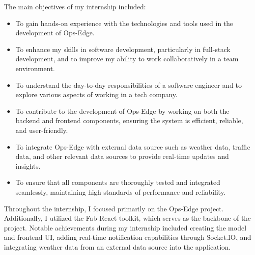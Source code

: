 The main objectives of my internship included:

\begin{itemize}
    \item To gain hands-on experience with the technologies and tools used in the development of Ops-Edge.
    \item To enhance my skills in software development, particularly in full-stack development, and to improve my ability to work collaboratively in a team environment.
    \item To understand the day-to-day responsibilities of a software engineer and to explore various aspects of working in a tech company.
    \item To contribute to the development of Ops-Edge by working on both the backend and frontend components, ensuring the system is efficient, reliable, and user-friendly.
    \item To integrate Ops-Edge with external data source such as weather data, traffic data, and other relevant data sources to provide real-time updates and insights.
    \item To ensure that all components are thoroughly tested and integrated seamlessly, maintaining high standards of performance and reliability.
\end{itemize}

Throughout the internship, I focused primarily on the Ops-Edge project. Additionally, I utilized the Fab React toolkit, which serves as the backbone of the project. Notable achievements during my internship included creating the model and frontend UI, adding real-time notification capabilities through Socket.IO, and integrating weather data from an external data source into the application.